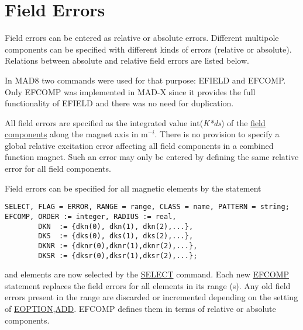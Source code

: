 
\section{Field Errors}
Field errors can be entered as relative or absolute errors. Different
multipole components can be specified with different kinds of errors
(relative or absolute). Relations between absolute and relative field
errors are listed below.  

In MAD8 two commands were used for that purpose: EFIELD and EFCOMP. Only
EFCOMP was implemented in MAD-X since it provides the full functionality
of EFIELD and there was no need for duplication.  

All field errors are specified as the integrated value
int(\textit{K*ds}) of the \href{../Introduction/sign_convent.html}{field
  components} along the magnet axis in m$^{-i}$. There is no provision
to specify a global relative excitation error affecting all field
components in a combined function magnet. Such an error may only be
entered by defining the same relative error for all field components.  

Field errors can be specified for all magnetic elements by the statement  

\begin{verbatim}
SELECT, FLAG = ERROR, RANGE = range, CLASS = name, PATTERN = string;
EFCOMP, ORDER := integer, RADIUS := real,
        DKN  := {dkn(0), dkn(1), dkn(2),...},
        DKS  := {dks(0), dks(1), dks(2),...},
        DKNR := {dknr(0),dknr(1),dknr(2),...},
        DKSR := {dksr(0),dksr(1),dksr(2),...};
\end{verbatim}
and elements are now selected by the
\href{../Introduction/select.html}{SELECT} command. Each new
\href{efcomp}{EFCOMP} statement replaces the field errors for all
elements in its range (s). Any old field errors present in the range are
discarded or incremented depending on the setting of
\href{error_option.html}{EOPTION,ADD}. EFCOMP defines them in terms of
relative or absolute components.  

